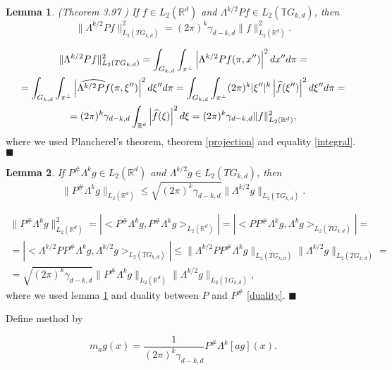 \documentclass[12pt]{iopart}
\newtheorem{lemma}{Lemma}
\newenvironment{proof}
{\par\noindent{\bf Proof}}
{\hfill$\scriptstyle\blacksquare$}
\begin{document}
\begin{lemma} (Theorem 3.97 \cite{MA})
\label{isometry}
If $f\in L_2(\mathbb R^d)$ and $\Lambda^{k/2}Pf\in L_2(\mathbb TG_{k,d})$, then
$$\|\Lambda^{k/2}Pf\|^2_{L_2(TG_{k,d})}=(2\pi)^k\gamma_{d-k,d}\|f\|^2_{L_2(\mathbb R^d)}.$$
\end{lemma}

\begin{proof}
\begin{multline*}
\|\Lambda^{k/2}Pf\|^2_{L_2(TG_{k,d})}=\int_{G_{k,d}}\int_{\pi^\perp}\left|\Lambda^{k/2}Pf(\pi,x'')\right|^2dx''d\pi=\\
=\int_{G_{k,d}}\int_{\pi^\perp}\left|\widehat{\Lambda^{k/2}Pf}(\pi,\xi'')\right|^2d\xi''d\pi=\int_{G_{k,d}}\int_{\pi^\perp}(2\pi)^k|\xi''|^k\left|\widehat{f}(\xi'')\right|^2d\xi''d\pi=\\
=(2\pi)^k\gamma_{d-k,d}\int_{\mathbb R^d}\left|\widehat{f}(\xi)\right|^2d\xi =(2\pi)^k\gamma_{d-k,d}\|f\|^2_{L_2(\mathbb R^d)},$$
\end{multline*}
where we used Plancherel's theorem, theorem \ref{projection} and equality \eqref{integral}.
\end{proof}

\begin{lemma}
\label{lemma2}
If $P^\#\Lambda^kg\in L_2(\mathbb R^d)$ and $\Lambda^{k/2}g\in L_2(TG_{k,d})$, then
$$\|P^\#\Lambda^kg\|_{L_2(\mathbb R^d)}\le\sqrt{(2\pi)^k\gamma_{d-k,d}}\|\Lambda^{k/2}g\|_{L_2(\mathbb TG_{k,d})}.$$
\end{lemma}

\begin{proof}
\begin{multline*}
\|P^\#\Lambda^kg\|_{L_2(\mathbb R^d)}^2=|<P^\#\Lambda^kg,P^\#\Lambda^kg>_{L_2(\mathbb R^d)}|=|<PP^\#\Lambda^kg,\Lambda^kg>_{L_2(TG_{k,d})}|=\\
=|<\Lambda^{k/2}PP^\#\Lambda^kg,\Lambda^{k/2}g>_{L_2(TG_{k,d})}|\le\|\Lambda^{k/2}PP^\#\Lambda^kg\|_{L_2(TG_{k,d})}\|\Lambda^{k/2}g\|_{L_2(TG_{k,d})}=\\
=\sqrt{(2\pi)^k\gamma_{d-k,d}}\|P^\#\Lambda^kg\|_{L_2(\mathbb R^d)}\|\Lambda^{k/2}g\|_{L_2(\mathbb TG_{k,d})},
\end{multline*}
where we used lemma \ref{isometry} and duality between $P$ and $P^\#$ \ref{duality}.
\end{proof}

Define method by 

$$m_ag(x) = \frac{1}{(2\pi)^k\gamma_{d-k,d}}P^\#\Lambda^k[a g](x).$$
\end{document}
